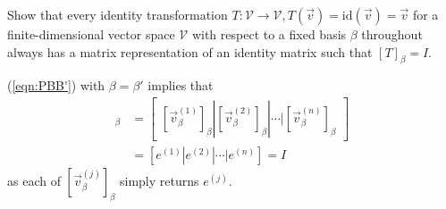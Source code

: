 \begin{Exercise}
Show that every identity transformation $T: \mathcal{V} \to \mathcal{V}, T(\vec{v}) = \text{id}(\vec{v}) = \vec{v}$ for a finite-dimensional vector space $\mathcal{V}$ with respect to a fixed basis $\mathcal{\beta}$ throughout always has a matrix representation of an identity matrix such that $[T]_\beta = I$. 
\end{Exercise}
\begin{Answer}
(\ref{eqn:PBB'}) with $\beta = \beta'$ implies that
\begin{align*}
[T]_\beta &= \begin{bmatrix}
[\vec{v}_{\beta}^{(1)}]_{\beta} | [\vec{v}_{\beta}^{(2)}]_{\beta} | \cdots | [\vec{v}_{\beta}^{(n)}]_{\beta}
\end{bmatrix} \\
&= [e^{(1)}|e^{(2)}|\cdots|e^{(n)}] = I
\end{align*}
as each of $[\vec{v}_{\beta}^{(j)}]_{\beta}$ simply returns $e^{(j)}$.
\end{Answer}

